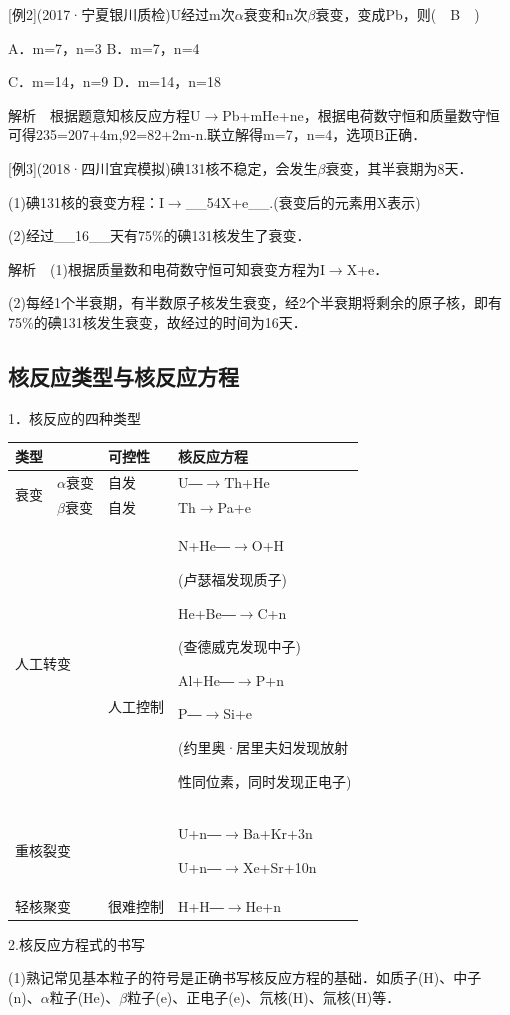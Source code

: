 {[}例2{]}(2017·宁夏银川质检)U经过m次$\alpha$衰变和n次$\beta$衰变，变成Pb，则(　B　)

A．m=7，n=3 B．m=7，n=4

C．m=14，n=9 D．m=14，n=18

解析　根据题意知核反应方程U$\rightarrow$Pb+mHe+ne，根据电荷数守恒和质量数守恒可得235=207+4m,92=82+2m-n.联立解得m=7，n=4，选项B正确．

{[}例3{]}(2018·四川宜宾模拟)碘131核不稳定，会发生$\beta$衰变，其半衰期为8天．

(1)碘131核的衰变方程：I$\rightarrow$\_\_54X+e\_\_.(衰变后的元素用X表示)

(2)经过\_\_16\_\_天有75\%的碘131核发生了衰变．

解析　(1)根据质量数和电荷数守恒可知衰变方程为I$\rightarrow$X+e．

(2)每经1个半衰期，有半数原子核发生衰变，经2个半衰期将剩余的原子核，即有75\%的碘131核发生衰变，故经过的时间为16天．
\newpage
\subsection{核反应类型与核反应方程}

1．核反应的四种类型

\begin{longtable}[]{@{}m{1cm}m{1cm}m{2cm}m{5cm}@{}}
\toprule
\multicolumn{2}{l}{类型}& 可控性 & 核反应方程 \tabularnewline
\midrule
\endhead
\multirow{2}{2cm}{衰变}
&
$\alpha$衰变
&
自发
&
U―$\rightarrow$Th+He\strut
\tabularnewline
& $\beta$衰变 & 自发 & Th$\rightarrow$Pa+e\tabularnewline
\multicolumn{2}{l}{人工转变}
&
\multirow{2}{2cm}{人工控制}    
&
N+He―$\rightarrow$O+H

(卢瑟福发现质子)

He+Be―$\rightarrow$C+n

(查德威克发现中子)

Al+He―$\rightarrow$P+n

P―$\rightarrow$Si+e

(约里奥·居里夫妇发现放射

性同位素，同时发现正电子)
\tabularnewline
\multicolumn{2}{l}{重核裂变}
& &
U+n―$\rightarrow$Ba+Kr+3n

U+n―$\rightarrow$Xe+Sr+10n
\tabularnewline
\multicolumn{2}{l}{轻核聚变}
& 很难控制 & H+H―$\rightarrow$He+n \tabularnewline
\bottomrule
\end{longtable}

2.核反应方程式的书写

(1)熟记常见基本粒子的符号是正确书写核反应方程的基础．如质子(H)、中子(n)、$\alpha$粒子(He)、$\beta$粒子(e)、正电子(e)、氘核(H)、氚核(H)等．

